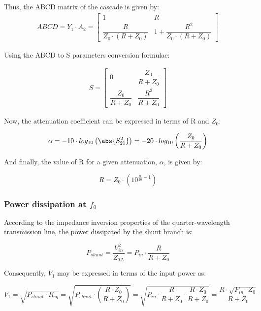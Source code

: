 \noindent Thus, the ABCD matrix of the cascade is given by:
\begin{gather}
 ABCD = Y_{1} \cdot A_{2} = \begin{bmatrix} 1 & R \\ \dfrac{R}{Z_0 \cdot (R + Z_0)} & 1 + \dfrac{R^2}{Z_0 \cdot (R + Z_0)} \end{bmatrix}
\end{gather}

\noindent Using the ABCD to S parameters conversion formulae:

\begin{gather}
 S = 
 \begin{bmatrix} 0 & \dfrac{Z_0}{R + Z_0} \\ \dfrac{Z_0}{R + Z_0} & \dfrac{R^2}{R + Z_0} \end{bmatrix}
\end{gather}


\noindent Now, the attenuation coefficient can be expressed in terms of R and $Z_0$:

\begin{equation}
\alpha = -10 \cdot log_{10} \left( \abs{S_{21}^2}\right) = -20 \cdot log_{10} \left(  \dfrac{Z_0}{R + Z_0}\right)
\end{equation}

\noindent And finally, the value of R for a given attenuation, $\alpha$, is given by:

\begin{equation}
R = Z_0 \cdot \left( 10^{\frac{\alpha}{20} - 1}\right)
\end{equation}

\subsubsection{Power dissipation at $f_0$}

\noindent According to the impedance inversion properties of the quarter-wavelength transmission line, the power dissipated by the shunt branch is:

\begin{equation}
P_{shunt} = \dfrac{V_{in}^2}{Z_{TL} } = P_{in} \cdot \dfrac{R}{R + Z_0}
\end{equation}

\noindent Consequently, $V_1$ may be expressed in terms of the input power as:

\begin{equation}
V_1 = \sqrt{P_{shunt} \cdot R_{eq}} = \sqrt{P_{shunt} \cdot \left( \dfrac{R \cdot Z_0}{R + Z_0}\right)} = \sqrt{P_{in} \cdot \dfrac{R}{R + Z_0} \cdot \dfrac{R \cdot Z_0}{R + Z_0}} = \dfrac{R \cdot \sqrt{P_{in} \cdot Z_0}}{R + Z_0}
\end{equation}

